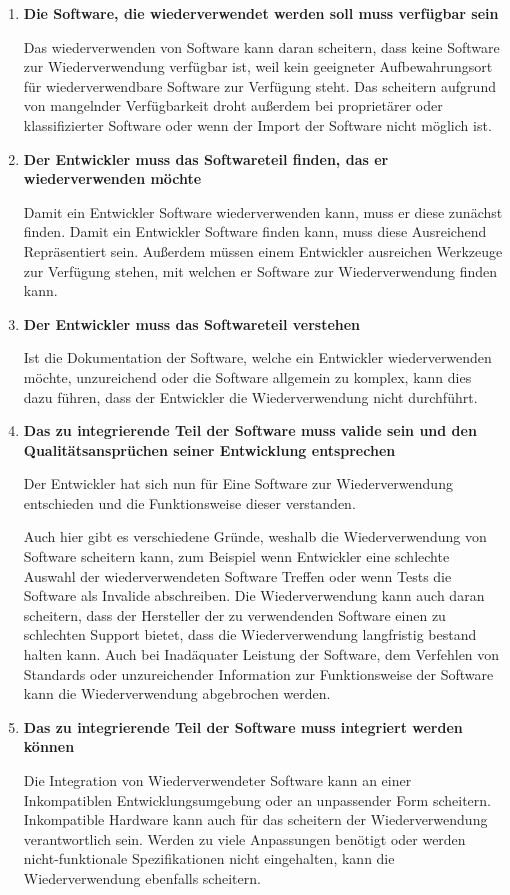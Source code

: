 \documentclass[utf8,biblatex]{lni}
\begin{document}
\begin{enumerate}
    \item \textbf{Die Software, die wiederverwendet werden soll muss verfügbar sein}
    
    Das wiederverwenden von Software kann daran scheitern, dass keine Software zur Wiederverwendung verfügbar ist, weil kein geeigneter Aufbewahrungsort für wiederverwendbare Software zur Verfügung steht. Das scheitern aufgrund von mangelnder Verfügbarkeit droht außerdem bei proprietärer oder klassifizierter Software oder wenn der Import der Software nicht möglich ist. 
    
    \item \textbf{Der Entwickler muss das Softwareteil finden, das er wiederverwenden möchte}
    
    Damit ein Entwickler Software wiederverwenden kann, muss er diese zunächst finden. Damit ein Entwickler Software finden kann, muss diese Ausreichend Repräsentiert sein. Außerdem müssen einem Entwickler ausreichen Werkzeuge zur Verfügung stehen, mit welchen er Software zur Wiederverwendung finden kann. 
    
    \item \textbf{Der Entwickler muss das Softwareteil verstehen}
    
    Ist die Dokumentation der Software, welche ein Entwickler wiederverwenden möchte, unzureichend oder die Software allgemein zu komplex, kann dies dazu führen, dass der Entwickler die Wiederverwendung nicht durchführt. 
    
    \item \textbf{Das zu integrierende Teil der Software muss valide sein und den Qualitätsansprüchen seiner Entwicklung entsprechen}
    
    Der Entwickler hat sich nun für Eine Software zur Wiederverwendung entschieden und die Funktionsweise dieser verstanden. 
    
    Auch hier gibt es verschiedene Gründe, weshalb die Wiederverwendung von Software scheitern kann, zum Beispiel wenn Entwickler eine schlechte Auswahl der wiederverwendeten Software Treffen oder wenn Tests die Software als Invalide abschreiben. Die Wiederverwendung kann auch daran scheitern, dass der Hersteller der zu verwendenden Software einen zu schlechten Support bietet, dass die Wiederverwendung langfristig bestand halten kann. Auch bei Inadäquater Leistung der Software, dem Verfehlen von Standards oder unzureichender Information zur Funktionsweise der Software kann die Wiederverwendung abgebrochen werden. 
    
    
    \item \textbf{Das zu integrierende Teil der Software muss integriert werden können}
    
    Die Integration von Wiederverwendeter Software kann an einer Inkompatiblen Entwicklungsumgebung oder an unpassender Form scheitern. Inkompatible Hardware kann auch für das scheitern der Wiederverwendung verantwortlich sein. Werden zu viele Anpassungen benötigt oder werden nicht-funktionale Spezifikationen nicht eingehalten, kann die Wiederverwendung ebenfalls scheitern. 
    
\end{enumerate}
\end{document}
